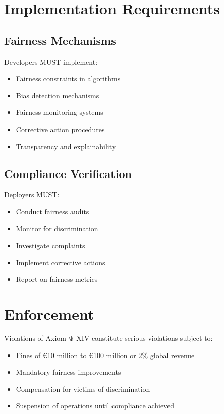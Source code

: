 \vspace{0.5cm}

\section{Implementation Requirements}

\subsection{Fairness Mechanisms}

Developers MUST implement:

\begin{itemize}
    \item Fairness constraints in algorithms
    \item Bias detection mechanisms
    \item Fairness monitoring systems
    \item Corrective action procedures
    \item Transparency and explainability
\end{itemize}

\subsection{Compliance Verification}

Deployers MUST:

\begin{itemize}
    \item Conduct fairness audits
    \item Monitor for discrimination
    \item Investigate complaints
    \item Implement corrective actions
    \item Report on fairness metrics
\end{itemize}

\vspace{0.5cm}

\section{Enforcement}

Violations of Axiom Ψ-XIV constitute serious violations subject to:

\begin{itemize}
    \item Fines of €10 million to €100 million or 2\% global revenue
    \item Mandatory fairness improvements
    \item Compensation for victims of discrimination
    \item Suspension of operations until compliance achieved
\end{itemize}

